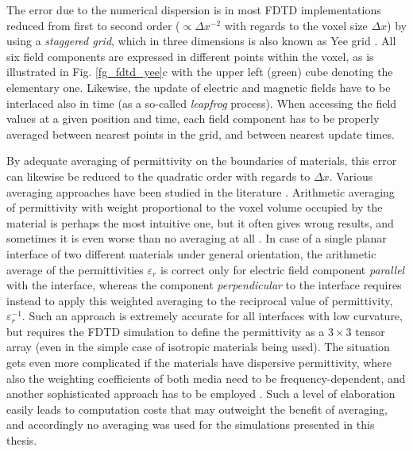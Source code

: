 The error due to the numerical dispersion is in most FDTD implementations reduced from first to second order ($\propto \Delta x^{-2}$ with regards to the voxel size $\Delta x$) by using a \textit{staggered grid}, which in three dimensions is also known as Yee grid \cite{yee1966numerical}. All six field components are expressed in different points within the voxel, as is illustrated in Fig. \ref{fg_fdtd_yee}c with the upper left (green) cube denoting the elementary one. 
Likewise, the update of electric and magnetic fields have to be interlaced also in time (as a so-called \textit{leapfrog} process). When accessing the field values at a given position and time, each field component has to be properly averaged between nearest points in the grid, and between nearest update times.


By adequate averaging of permittivity on the boundaries of materials, this error can likewise be reduced to the quadratic order with regards to $\Delta x$. Various averaging approaches have been studied in the literature \cite{oskooi2010meep}. Arithmetic averaging of permittivity with weight proportional to the voxel volume occupied by the material is perhaps the most intuitive one, but it often gives wrong results, and  sometimes it is even worse than no averaging at all \cite{farjadpour2006improving,deinega2007subpixel}. In case of a single planar interface of two different materials under general orientation, the arithmetic average of the permittivities $\varepsilon_r$ is correct only for electric field component \textit{parallel} with the interface, whereas the component \textit{perpendicular} to the interface requires instead to apply this weighted averaging to the reciprocal value of permittivity, $\varepsilon_r^{-1}$. Such an approach is extremely accurate for all interfaces with low curvature, but requires the FDTD simulation to define the permittivity as a $3\times 3$ tensor array (even in the simple case of isotropic materials being used). The situation gets even more  complicated if the materials have dispersive permittivity, where also the weighting coefficients of both media need to be frequency-dependent, and another sophisticated approach has to be employed \cite{deinega2007subpixel,hamm2013dispersive}. Such a level of elaboration easily leads to computation costs that may outweight the benefit of averaging, and accordingly no averaging was used for the simulations presented in this thesis. 

